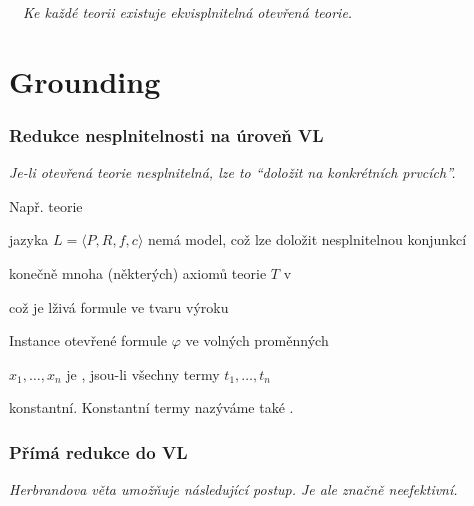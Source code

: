     {\bf {}}\ \ {\it Ke každé teorii existuje ekvisplnitelná otevřená teorie.}
    
    


\section{Grounding}\label{section:grounding}
\todo

\subsubsection*{Redukce nesplnitelnosti na úroveň VL}
    {\it Je-li otevřená teorie nesplnitelná, lze to ``doložit na konkrétních prvcích''.}
    \medskip
    
    { Např. teorie}
    \vspace{-1mm}
    
    \vspace{-5mm}
    { jazyka $L=\langle P,R,f,c \rangle$ nemá model, což lze doložit nesplnitelnou konjunkcí
    \smallskip
    
    konečně mnoha  (některých) axiomů teorie $T$ v }
    \vspace{-1mm}
    
    \vspace{-5mm}
    { což je lživá formule ve tvaru výroku}
    \vspace{-1mm}
    
    \vspace{-2mm}
    Instance  otevřené formule $\varphi$ ve volných proměnných
    \smallskip
    
    $x_1,\dots,x_n$ je , jsou-li všechny termy $t_1,\dots,t_n$
    \smallskip
    
    konstantní. Konstantní termy nazýváme také .
    
    


\subsubsection*{Přímá redukce do VL}
    
    {\it Herbrandova věta umožňuje následující postup. Je ale značně neefektivní.}
    \smallskip
    
